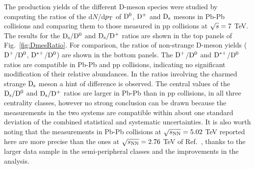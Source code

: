 The production yields of the different D-meson species were studied by computing
the ratios of the d$N$/d$p_{\rm T}$ of ${\rm D^0}$, ${\rm D^+}$ and ${\rm D_s}$ mesons in Pb-Pb collisions
and comparing them to those measured in pp collisions at $\sqrt{s} = 7 $ TeV.
The results for the ${\rm D_s}/{\rm D^0}$ and ${\rm D_s}/{\rm D^+}$ ratios are shown in the top panels of
Fig.~\ref{fig:DmesRatio}. For comparison, the ratios of 
non-strange D-meson yields (${\rm D^+}$/${\rm D^0}$, ${\rm D^{*+}}$/${\rm D^0}$) are shown in the bottom panels.
The ${\rm D^+}$/${\rm D^0}$ and ${\rm D^{*+}}$/${\rm D^0}$ ratios are compatible in Pb-Pb and pp collisions, 
indicating no significant modification of their relative abundances. 
In the ratios involving the charmed strange ${\rm D_s}$ meson a hint of difference is observed.
The central values of the ${\rm D_s}/{\rm D^0}$ and ${\rm D_s}/{\rm D^+}$ ratios are larger in Pb-Pb than in pp collisions, 
in all three centrality classes, however no strong conclusion can be drawn because the measurements in the two systems 
are compatible within about one standard deviation of the combined statistical and systematic uncertainties.
It is also worth noting that the measurements in Pb-Pb collisions at $\sqrt{s_{\rm NN}} = 5.02$ TeV reported
here are more precise than the ones at $\sqrt{s_{\rm NN}} = 2.76$ TeV of Ref.~\cite{Adam:2015jda}, thanks to the larger
data sample in the semi-peripheral classes and the improvements in the analysis.\\

